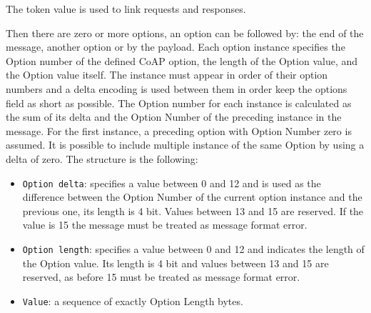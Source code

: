 	The token value is used to link requests and responses.\newline

	Then there are zero or more options, an option can be followed by: the end of the message, another option or by the payload.\newline
	Each option instance specifies the Option number of the defined CoAP option, the length of the Option value, and the Option value itself.\newline
	The instance must appear in order of their option numbers and a delta encoding is used between them in order keep the options field as short as possible.\newline
	The Option number for each instance is calculated as the sum of its delta and the Option Number of the preceding instance in the message.\newline
	For the first instance, a preceding option with Option Number zero is assumed.\newline
	It is possible to include multiple instance of the same Option by using a delta of zero.\newline
	The structure is the following:\newline
	\begin{itemize}
		\item \texttt{Option delta}: specifies a value between 0 and 12 and is used as the difference between the Option Number of the current option instance and the previous one, its length is 4 bit.
		Values between 13 and 15 are reserved.
		If the value is 15 the message must be treated as message format error.
		\item \texttt{Option length}: specifies a value between 0 and 12 and indicates the length of the Option value.
		Its length is 4 bit and values between 13 and 15 are reserved, as before 15 must be treated as message format error.
		\item \texttt{Value}: a sequence of exactly Option Length bytes.
	\end{itemize}

